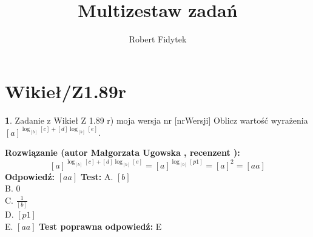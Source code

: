 \documentclass[12pt, a4paper]{article}
\title{Multizestaw zadań}
\author{Robert Fidytek}
\date{}
\theoremstyle{definition} %
\newtheorem{zad}{}
\newcommand{\kategoria}[1]{\section{#1}} %
\newcommand{\zadStart}[1]{\begin{zad}#1\newline} %
\newcommand{\zadStop}{\end{zad}}   %
\newcommand{\rozwStart}[2]{\noindent \textbf{Rozwiązanie (autor #1 , recenzent #2): }\newline} %
\newcommand{\rozwStop}{\newline}                                            %
\newcommand{\odpStart}{\noindent \textbf{Odpowiedź:}\newline}    %
\newcommand{\odpStop}{\newline}                                             %
\newcommand{\testStart}{\noindent \textbf{Test:}\newline} %
\newcommand{\testStop}{\newline} %
\newcommand{\kluczStart}{\noindent \textbf{Test poprawna odpowiedź:}\newline} %
\newcommand{\kluczStop}{\newline} %
\begin{document}
\maketitle


\kategoria{Wikieł/Z1.89r}
\zadStart{Zadanie z Wikieł Z 1.89 r) moja wersja nr [nrWersji]}
Oblicz warto\'sć wyrażenia $[a]^{\log_{[b]}{[c]}+ [d] \log_{[b]}{[e]}}$.
\zadStop
\rozwStart{Małgorzata Ugowska}{}
$$[a]^{\log_{[b]}{[c]}+ [d] \log_{[b]}{[e]}} = [a]^{\log_{[b]}{[p1]}} = [a]^2 = [aa]$$
\rozwStop
\odpStart
$[aa]$
\odpStop
\testStart
A. $[b]$\\
B. $0$\\
C. $\frac{1}{[b]}$\\
D. $[p1]$\\
E. $[aa]$
\testStop
\kluczStart
E
\kluczStop
\end{document}
